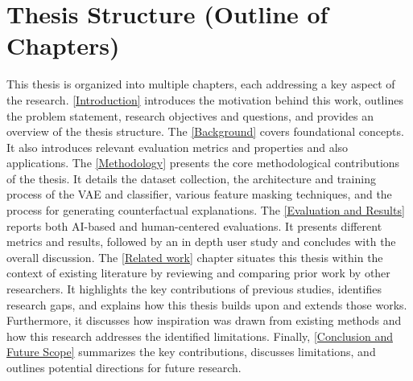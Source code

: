 \section{Thesis Structure (Outline of Chapters)}
This thesis is organized into multiple chapters, each addressing a key aspect of the research. \autoref{Introduction} introduces the motivation behind this work, outlines the problem statement, research objectives and questions, and provides an overview of the thesis structure. The
\autoref{Background} covers foundational concepts. It also introduces relevant evaluation metrics and properties and also applications.
The \autoref{Methodology} presents the core methodological contributions of the thesis. It details the dataset collection, the architecture and training process of the VAE and classifier, various feature masking techniques, and the process for generating counterfactual explanations. The \autoref{Evaluation and Results} reports both AI-based and human-centered evaluations. It presents different metrics and results, followed by an in depth user study and concludes with the overall discussion. The \autoref{Related work} chapter situates this thesis within the context of existing literature by reviewing and comparing prior work by other researchers. It highlights the key contributions of previous studies, identifies research gaps, and explains how this thesis builds upon and extends those works. Furthermore, it discusses how inspiration was drawn from existing methods and how this research addresses the identified limitations. Finally, \autoref{Conclusion and Future Scope} summarizes the key contributions, discusses limitations, and outlines potential directions for future research.